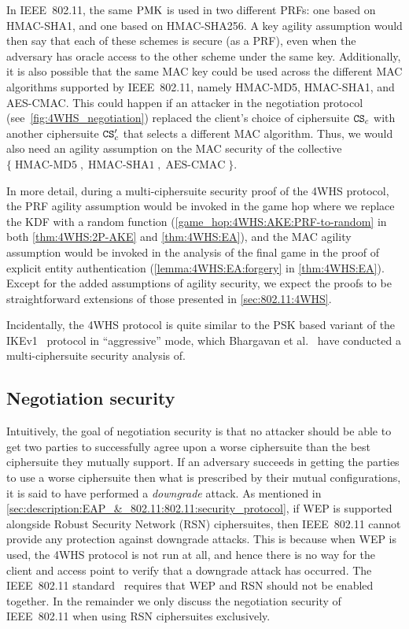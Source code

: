 In IEEE~802.11, the same $\mathrm{PMK}$ is used in two different PRFs: 
one based on HMAC-SHA1,
and one based on HMAC-SHA256.
A key agility assumption would then say that each of these schemes is secure
(as a PRF),
even when the adversary has oracle access to the other scheme under the same key.
Additionally,
it is also possible that the same MAC key could be used across the different MAC algorithms supported by IEEE~802.11,
namely HMAC-MD5, HMAC-SHA1, and AES-CMAC.
This could happen if an attacker in the negotiation protocol (see~\cref{fig:4WHS_negotiation}) replaced the client's choice of ciphersuite $\mathtt{CS}_c$ with another ciphersuite $\mathtt{CS}_c'$ that selects a different MAC algorithm. 
Thus,
we would also need an agility assumption on the MAC security of the collective $\lbrace \operatorname{HMAC-MD5}, \operatorname{HMAC-SHA1}, \operatorname{AES-CMAC}  \rbrace$.


In more detail,
during a multi-ciphersuite security proof of the 4WHS protocol, the PRF agility assumption would be invoked in the game hop where we replace the KDF with a random function
(\cref{game_hop:4WHS:AKE:PRF-to-random} in both \cref{thm:4WHS:2P-AKE} and \cref{thm:4WHS:EA}),
and the MAC agility assumption would be invoked in the analysis of the final game in the proof of explicit entity authentication 
(\cref{lemma:4WHS:EA:forgery} in \cref{thm:4WHS:EA}).
Except for the added assumptions of agility security,
we expect the proofs to be straightforward extensions of those presented in \cref{sec:802.11:4WHS}. 


Incidentally,
the 4WHS protocol is quite similar to the PSK based variant of the IKEv1~\cite{IETF:RFC2409:IKEv1} protocol in ``aggressive'' mode,
which Bhargavan et al.~\cite{SP:BBFGKB16} have conducted a multi-ciphersuite security analysis of.



\subsection{Negotiation security}
Intuitively,
the goal of negotiation security is that no attacker should be able to get two parties to successfully agree upon a worse ciphersuite than the best ciphersuite they mutually support.
If an adversary succeeds in getting the parties to use a worse ciphersuite then what is prescribed by  their mutual configurations,
it is said to have performed a \emph{downgrade} attack.
As mentioned in \cref{sec:description:EAP_&_802.11:802.11:security_protocol},
if WEP is supported alongside Robust Security Network (RSN) ciphersuites,
then IEEE~802.11 cannot provide any protection against downgrade attacks.
This is because when WEP is used,
the 4WHS protocol is not run at all,
and hence there is no way for the client and access point to verify that a downgrade attack has occurred.
The IEEE~802.11 standard~\cite{IEEE:2012:802.11} requires that WEP and RSN should not be enabled together.
In the remainder we only discuss the negotiation security of IEEE~802.11 when using RSN ciphersuites exclusively.

